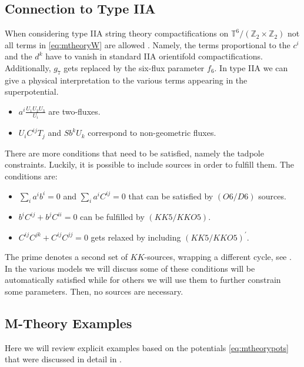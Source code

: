 \documentclass[a4paper,12pt]{report}
\begin{document}
\subsection{Connection to Type IIA}
\label{sec:IIAconn}
When considering type IIA string theory compactifications on $\mathbb{T}^6/(\mathbb{Z}_2 \times \mathbb{Z}_2)$ not all terms in \ref{eq:mtheoryW} are allowed \cite{Derendinger:2014wwa,Blaback:2018hdo,Villadoro:2007yq}. Namely, the terms proportional to the $c^i$ and the $d^k$ have to vanish in standard IIA orientifold compactifications. Additionally, $g_7$ gets replaced by the six-flux parameter $f_6$. In type IIA  we can give a physical interpretation to the various terms appearing in the superpotential. 
\begin{itemize}
\item $a^i \frac{U_1 U_2 U_3}{U_i}$ are two-fluxes.
\item $U_i C^{ij} T_j$ and $S b^k U_k$ correspond to non-geometric fluxes.
\end{itemize}
There are more conditions that need to be satisfied, namely the tadpole constraints. Luckily, it is possible to include sources in order to fulfill them. The conditions are:
\begin{itemize}
\item $\sum_i a^i b^i = 0$ and $\sum_i a^i C^{ij} = 0$ that can be satisfied by $(O6/D6)$ sources.
\item $b^i C^{ij} + b^j C^{ii} = 0$ can be fulfilled by $(KK5/KKO5)$.
\item $C^{ij}C^{jk} + C^{ij} C^{jj} = 0$ gets relaxed by including $(KK5/KKO5)^\prime$.
\end{itemize}
The prime denotes a second set of $KK$-sources, wrapping a different cycle, see \cite{Blaback:2018hdo}.\\
In the various models we will discuss some of these conditions will be automatically satisfied while for others we will use them to further constrain some parameters. Then, no sources are necessary. 

\subsection{M-Theory Examples}
\label{sec:mtheoryexamples}
Here we will review explicit examples based on the potentials \eqref{eq:mtheorypots} that were discussed in detail in \cite{Cribiori:2019hrb}.
\end{document}
